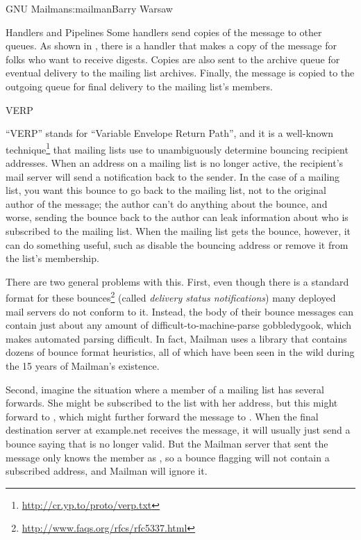 \begin{aosachapter}{GNU Mailman}{s:mailman}{Barry Warsaw}
\begin{aosasect1}{Handlers and Pipelines}
Some handlers send copies of the message to other queues.  As shown in
, there is a handler that makes a
copy of the message for folks who want to receive digests.  Copies are
also sent to the archive queue for eventual delivery to the mailing
list archives.  Finally, the message is copied to the outgoing queue
for final delivery to the mailing list's members.

\end{aosasect1}

\begin{aosasect1}{VERP}

``VERP'' stands for ``Variable Envelope Return Path'', and it is a
well-known technique\footnote{\url{http://cr.yp.to/proto/verp.txt}}
that mailing lists use to unambiguously determine bouncing
recipient addresses.  When an address on a mailing list is no longer
active, the recipient's mail server will send a notification back to
the sender.  In the case of a mailing list, you want this bounce to go
back to the mailing list, not to the original author of the message;
the author can't do anything about the bounce, and worse, sending the
bounce back to the author can leak information about who is subscribed
to the mailing list.  When the mailing list gets the bounce, however, it can do
something useful, such as disable the bouncing address or remove it
from the list's membership.

There are two general problems with this.  First, even though there is
a standard format for these
bounces\footnote{\url{http://www.faqs.org/rfcs/rfc5337.html}} (called
\emph{delivery status notifications}) many deployed mail servers do
not conform to it.  Instead, the body of their bounce messages can
contain just about any amount of difficult-to-machine-parse
gobbledygook, which makes automated parsing difficult.  In fact,
Mailman uses a library that contains dozens of bounce format
heuristics, all of which have been seen in the wild during the 15
years of Mailman's existence.

Second, imagine the situation where a member of a mailing list has
several forwards.  She might be subscribed to the list with her
 address, but this might forward to
, which might further forward the message to
.  When the final destination server at example.net
receives the message, it will usually just send a bounce saying that
 is no longer valid.  But the Mailman server that sent
the message only knows the member as , so a bounce
flagging  will not contain a subscribed address, and
Mailman will ignore it.


\end{aosasect1}
\end{aosachapter}
